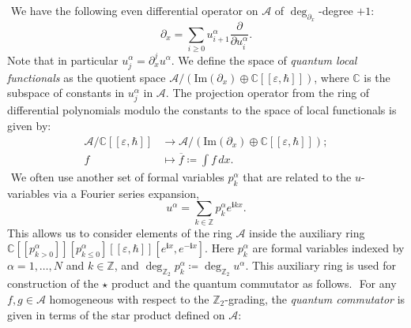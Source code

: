 \documentclass{amsart}
\numberwithin{equation}{section} %
\theoremstyle{plain}
\theoremstyle{remark}
\def\cxi{\mathbf{i}}
\begin{document}
﻿
We have the following even differential operator on $\mathcal{A}$ of $\deg_{\partial_{x}}$-degree $+1$:
\begin{equation*}
    \partial_x = \sum_{i\geq 0} u^{\alpha}_{i+1}\frac{\partial}{\partial u^\alpha_i}.
\end{equation*}
Note that in particular $u^\alpha_j = \partial_x^j u^\alpha$.
﻿
﻿
﻿
﻿
We define the space of \emph{quantum local functionals} as the quotient space $\mathcal{A}/ (\mathrm{Im}(\partial_x) \oplus \mathbb{C}[\![\varepsilon,\hbar]\!])$, where $\mathbb{C}$ is the subspace of constants in $u^{\alpha}_j$ in $\mathcal{A}$. The projection operator from the ring of differential polynomials modulo the constants to the space of local functionals is given by:
\begin{align*}
 \mathcal{A}/\mathbb{C}[\![\varepsilon,\hbar]\!] & \rightarrow \mathcal{A}/ \left(\textrm{Im}(\partial_x)\oplus \mathbb{C}[\![\varepsilon,\hbar]\!]\right); \\
f & \mapsto \overline{f}\coloneqq \int f\, dx.
\end{align*}
﻿
We often use another set of formal variables $p^{\alpha}_{k}$ that are related to the $u$-variables via a Fourier series expansion,
\begin{equation}
\label{eqn: fourier series expansion}
    u^\alpha = \sum_{k \in \mathbb{Z}} p^\alpha_k e^{\cxi k x}.
\end{equation}
This allows us to consider elements of the ring $\mathcal{A}$ inside the auxiliary ring $\mathbb{C}[\![ p^{\alpha}_{k>0} ]\!][p^{\alpha}_{k\leq 0}][\![\varepsilon,\hbar]\!][e^{\cxi x}, e^{-\cxi x}]$.
Here $p^{\alpha}_{k}$ are formal variables indexed by $\alpha = 1, \ldots, N$ and $k \in \mathbb{Z}$, and $\deg_{\mathbb{Z}_2}  p^{\alpha}_{k} \coloneqq \deg_{\mathbb{Z}_2} u^\alpha$.  This auxiliary ring is used for construction of the $\star$ product and the quantum commutator as follows.
﻿
For any $f,g\in \mathcal{A}$ homogeneous with respect to the $\mathbb{Z}_2$-grading, the \textit{quantum commutator} is given in terms of the star product defined on $\mathcal{A}$:
\end{document}
